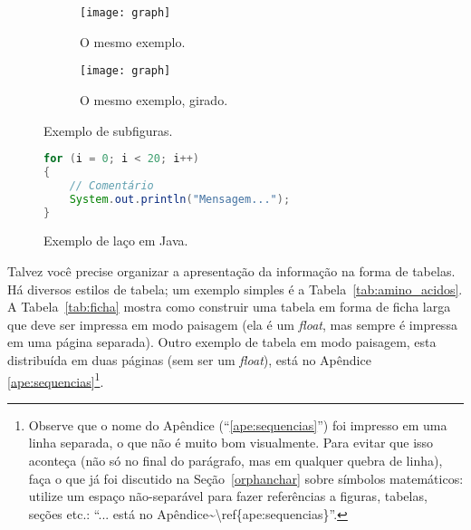 \begin{figure}
  \centering
  \begin{subfigure}{0.4\textwidth}
    \centering
    \texttt{[image: graph]}
    \caption{O mesmo exemplo.}
    \label{fig:subfigures:a}
  \end{subfigure}
  \begin{subfigure}{0.4\textwidth}
    \centering
    \begin{turn}{90}
      \texttt{[image: graph]}
    \end{turn}
    \caption{O mesmo exemplo, girado.}
    \label{fig:subfigures:b}
  \end{subfigure}
  \caption{Exemplo de subfiguras.}
  \label{fig:subfigures}
\end{figure}


\begin{figure}
  \centering
\begin{lstlisting}[language=Java, style=wider]
for (i = 0; i < 20; i++)
{
	// Comentário
	System.out.println("Mensagem...");
}
\end{lstlisting}
  \caption{Exemplo de laço em Java.}
  \label{fig:java}
\end{figure}

Talvez você precise organizar a apresentação da informação na forma de
tabelas. Há diversos estilos de tabela; um exemplo simples é a
Tabela~\ref{tab:amino_acidos}. A Tabela~\ref{tab:ficha} mostra como construir
uma tabela em forma de ficha larga que deve ser impressa em modo paisagem (ela
é um \textit{float}, mas sempre é impressa em uma página separada). Outro
exemplo de tabela em modo paisagem, esta distribuída em duas páginas (sem ser
um \textit{float}), está no Apêndice \ref{ape:sequencias}\footnote{
Observe que o nome do Apêndice (``\ref{ape:sequencias}'') foi impresso em uma
linha separada, o que não é muito bom visualmente. Para evitar que isso
aconteça (não só no final do parágrafo, mas em qualquer quebra de linha),
faça o que já foi discutido na Seção~\ref{orphanchar} sobre símbolos
matemáticos: utilize um espaço não-separável para fazer referências a
figuras, tabelas, seções etc.: ``\textsf{... está no
Apêndice\textasciitilde\textbackslash{}ref\{ape:sequencias\}}''.}.

